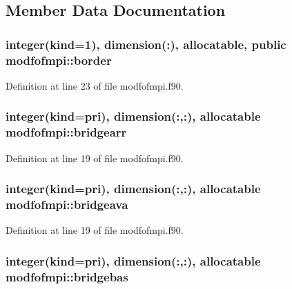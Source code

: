 \subsection{Member Data Documentation}
\hypertarget{classmodfofmpi_adb1afd2b26b96173f56ab37495e99e99}{
\subsubsection[{border}]{\setlength{\rightskip}{0pt plus 5cm}integer(kind=1), dimension(\-:), allocatable, public modfofmpi\-::border}}\label{classmodfofmpi_adb1afd2b26b96173f56ab37495e99e99}


Definition at line 23 of file modfofmpi.\-f90.

\hypertarget{classmodfofmpi_a3dffef2edd7b2899179cb3ffffd62430}{
\subsubsection[{bridgearr}]{\setlength{\rightskip}{0pt plus 5cm}integer(kind=pri), dimension(\-:,\-:), allocatable modfofmpi\-::bridgearr}}\label{classmodfofmpi_a3dffef2edd7b2899179cb3ffffd62430}


Definition at line 19 of file modfofmpi.\-f90.

\hypertarget{classmodfofmpi_a9891331c8f9f2ef3b5532b96129683ac}{
\subsubsection[{bridgeava}]{\setlength{\rightskip}{0pt plus 5cm}integer(kind=pri), dimension(\-:,\-:), allocatable modfofmpi\-::bridgeava}}\label{classmodfofmpi_a9891331c8f9f2ef3b5532b96129683ac}


Definition at line 19 of file modfofmpi.\-f90.

\hypertarget{classmodfofmpi_a2bdd3864a996f2afb8e49bbcdbd120e5}{
\subsubsection[{bridgebas}]{\setlength{\rightskip}{0pt plus 5cm}integer(kind=pri), dimension(\-:,\-:), allocatable modfofmpi\-::bridgebas}}\label{classmodfofmpi_a2bdd3864a996f2afb8e49bbcdbd120e5}


